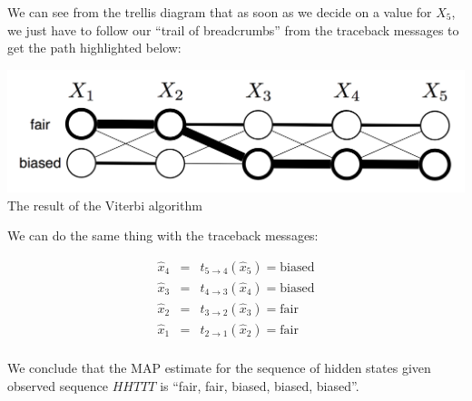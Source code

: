 \documentclass[6008notes.tex]{subfiles}
\begin{document}
We can see from the trellis diagram that as soon as we decide on a value for $X_5$, we just have to follow our ``trail of breadcrumbs'' from the traceback messages to get the path highlighted below:

{\centering\includegraphics[scale=0.3]{images_sec-viterbi-trellis6}\\
The result of the Viterbi algorithm \par}

We can do the same thing with the traceback messages:

\begin{eqnarray*}
\hat{x}_4 &=& t_{5 \rightarrow 4}(\hat{x}_5) 
          = \text{biased} \\
\hat{x}_3 &=& t_{4 \rightarrow 3}(\hat{x}_4) 
          = \text{biased} \\
\hat{x}_2 &=& t_{3 \rightarrow 2}(\hat{x}_3) 
          = \text{fair} \\
\hat{x}_1 &=& t_{2 \rightarrow 1}(\hat{x}_2) 
          = \text{fair} \\
\end{eqnarray*}

We conclude that the MAP estimate for the sequence of hidden states given observed sequence $HHTTT$ is ``fair, fair, biased, biased, biased''.
\end{document}
